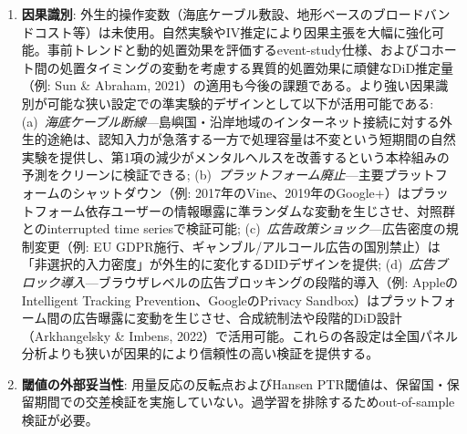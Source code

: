 \documentclass[a4paper,11pt,titlepage]{article}
\begin{document}
\begin{enumerate}
  \item \textbf{因果識別}: 外生的操作変数（海底ケーブル敷設、地形ベースのブロードバンドコスト等）は未使用。自然実験やIV推定により因果主張を大幅に強化可能。事前トレンドと動的処置効果を評価するevent-study仕様、およびコホート間の処置タイミングの変動を考慮する異質的処置効果に頑健なDiD推定量（例: Sun \& Abraham, 2021）の適用も今後の課題である。より強い因果識別が可能な狭い設定での準実験的デザインとして以下が活用可能である: (a)~\textit{海底ケーブル断線}---島嶼国・沿岸地域のインターネット接続に対する外生的途絶は、認知入力が急落する一方で処理容量は不変という短期間の自然実験を提供し、第1項の減少がメンタルヘルスを改善するという本枠組みの予測をクリーンに検証できる; (b)~\textit{プラットフォーム廃止}---主要プラットフォームのシャットダウン（例: 2017年のVine、2019年のGoogle+）はプラットフォーム依存ユーザーの情報曝露に準ランダムな変動を生じさせ、対照群とのinterrupted time seriesで検証可能; (c)~\textit{広告政策ショック}---広告密度の規制変更（例: EU GDPR施行、ギャンブル/アルコール広告の国別禁止）は「非選択的入力密度」が外生的に変化するDIDデザインを提供; (d)~\textit{広告ブロック導入}---ブラウザレベルの広告ブロッキングの段階的導入（例: AppleのIntelligent Tracking Prevention、GoogleのPrivacy Sandbox）はプラットフォーム間の広告曝露に変動を生じさせ、合成統制法や段階的DiD設計（Arkhangelsky \& Imbens, 2022）で活用可能。これらの各設定は全国パネル分析よりも狭いが因果的により信頼性の高い検証を提供する。
  \item \textbf{閾値の外部妥当性}: 用量反応の反転点およびHansen PTR閾値は、保留国・保留期間での交差検証を実施していない。過学習を排除するためout-of-sample検証が必要。

\end{enumerate}
\end{document}

